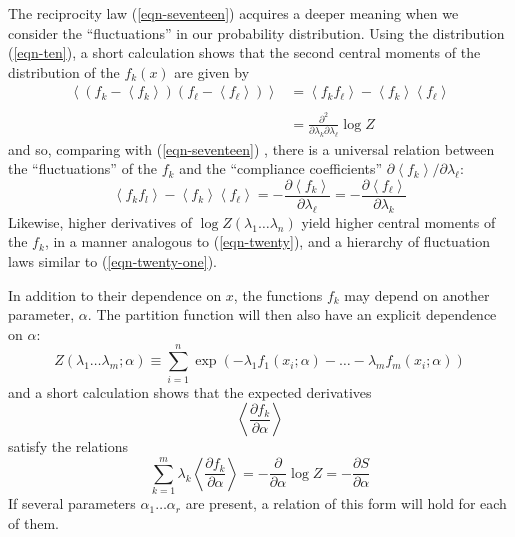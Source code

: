 \documentclass[]{article}
\begin{document}
The reciprocity law (\ref{eqn-seventeen}) acquires a deeper meaning when we consider the
``fluctuations'' in our probability distribution. Using the distribution
(\ref{eqn-ten}), a short calculation shows that the second central moments of the
distribution of the \(f_{k}(x)\) are given by
%
\begin{align}
\left\langle \left( f_{k} - \left\langle f_{k} \right\rangle \right)\left( f_{ \ell} - \left\langle f_{ \ell} \right\rangle \right) \right\rangle & = \left\langle f_{k}f_{ \ell} \right\rangle - \left\langle f_{k} \right\rangle\left\langle f_{ \ell} \right\rangle \nonumber \\
\label{eqn-twenty} \\
 & =  \frac{\partial^{2}}{\partial\lambda_{k}\partial\lambda_{ \ell}} \log Z \nonumber
\end{align}
%
and so, comparing with (\ref{eqn-seventeen}) , there is a universal relation between the
``fluctuations'' of the \(f_{k}\) and the ``compliance coefficients''
\(\partial\left\langle f_{k} \right\rangle/\partial\lambda_{ \ell}\):
%
\begin{equation}
\left\langle f_{k}f_{l} \right\rangle - \left\langle f_{k} \right\rangle\left\langle f_{ \ell} \right\rangle = - \frac{\partial\left\langle f_{k} \right\rangle}{\partial\lambda_{ \ell}} = - \frac{\partial\left\langle f_{ \ell} \right\rangle}{\partial\lambda_{k}} \label{eqn-twenty-one}
\end{equation}
%
Likewise, higher derivatives of
\( \log Z\left( \lambda_{1}\ldots\lambda_{n} \right)\) yield higher central
moments of the \(f_{k}\), in a manner analogous to (\ref{eqn-twenty}), and a hierarchy
of fluctuation laws similar to (\ref{eqn-twenty-one}).

In addition to their dependence on \(x\), the functions \(f_{k}\) may
depend on another parameter, \(\alpha.\) The partition function will
then also have an explicit dependence on \(\alpha\):
%
\begin{equation}
Z\left( \lambda_{1}\ldots\lambda_{m};\alpha \right) \equiv \sum_{i = 1}^{n}  \exp\left( - \lambda_{1}f_{1}\left( x_{i};\alpha \right) - \ldots - \lambda_{m}f_{m}\left( x_{i};\alpha \right) \right)
\end{equation}
%
and a short calculation shows that the expected derivatives
%
\begin{equation*}
\left\langle \frac{\partial f_{k}}{\partial\alpha} \right\rangle
\end{equation*}
%
satisfy the relations
%
\begin{equation}
\sum_{k = 1}^{m} \lambda_{k}\left\langle \frac{\partial f_{k}}{\partial\alpha} \right\rangle = - \frac{\partial}{\partial\alpha} \log Z = - \frac{\partial S}{\partial\alpha} \label{eqn-twenty-three}
\end{equation}
%
If several parameters \(\alpha_{1}\ldots\alpha_{r}\) are present, a
relation of this form will hold for each of them.
\end{document}
